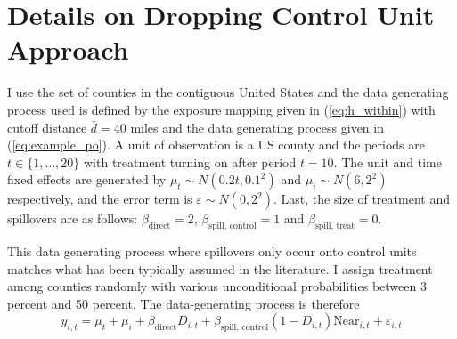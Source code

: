 \documentclass[11pt]{article}
\begin{document}
\section{Details on Dropping Control Unit Approach}
\label{sec:monte_carlo}
\setcounter{figure}{0}
\setcounter{table}{0}

I use the set of counties in the contiguous United States and the data generating process used is defined by the exposure mapping given in (\ref{eq:h_within}) with cutoff distance $\bar{d} = 40$ miles and the data generating process given in (\ref{eq:example_po}). A unit of observation is a US county and the periods are $t \in \{1, \dots, 20\}$ with treatment turning on after period $t = 10$. The unit and time fixed effects are generated by $\mu_t \sim N(0.2t, 0.1^2)$ and $\mu_i \sim N(6, 2^2)$ respectively, and the error term is $\varepsilon \sim N(0, 2^2)$. Last, the size of treatment and spillovers are as follows: $\beta_{\text{direct}} = 2$, $\beta_{\text{spill, control}} = 1$ and $\beta_{\text{spill, treat}} = 0$.

This data generating process where spillovers only occur onto control units matches what has been typically assumed in the literature. I assign treatment among counties randomly with various unconditional probabilities between 3 percent and 50 percent. The data-generating process is therefore 
\begin{equation}
    \label{eq:dgp1} 
    y_{i,t} = \mu_t + \mu_i + \beta_{\text{direct}} D_{i,t} + \beta_{\text{spill, control}} (1-D_{i,t}) \text{Near}_{i,t} + \varepsilon_{i,t}   
\end{equation}
\end{document}
